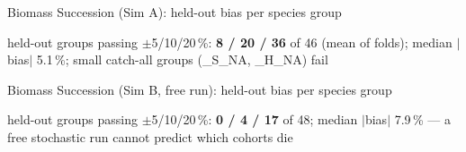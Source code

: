 \begin{frame}{Biomass Succession (Sim A): held-out bias per species group}
\begin{center}\scriptsize held-out groups passing $\pm$5/10/20\,\%: \textbf{8 / 20 / 36} of 46 (mean of folds); median $|$bias$|$ 5.1\,\%; small catch-all groups (\_S\_NA, \_H\_NA) fail\end{center}
\end{frame}

\begin{frame}{Biomass Succession (Sim B, free run): held-out bias per species group}
\begin{center}\scriptsize held-out groups passing $\pm$5/10/20\,\%: \textbf{0 / 4 / 17} of 48; median $|$bias$|$ 7.9\,\% — a free stochastic run cannot predict which cohorts die\end{center}
\end{frame}
